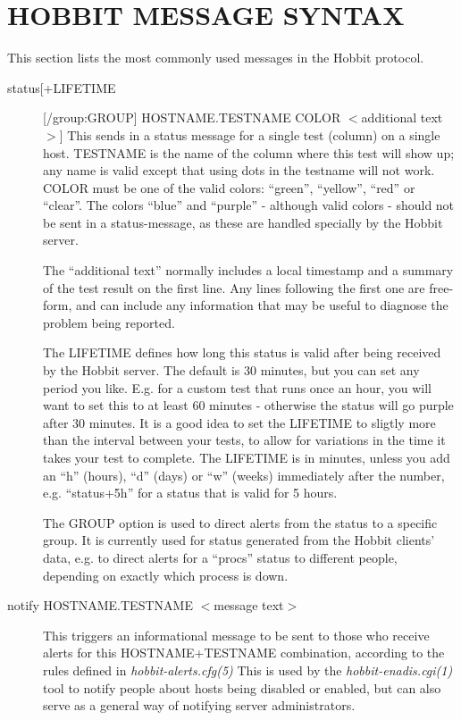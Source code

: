\section{HOBBIT MESSAGE SYNTAX}


This section lists the most commonly used messages in the Hobbit protocol. 


\begin{description}

\item[status[+LIFETIME][/group:GROUP] HOSTNAME.TESTNAME COLOR
  $<$additional text$>$] This sends in a status message for a single
  test (column) on a single host. TESTNAME is the name of the column
  where this test will show up; any name is valid except that using
  dots in the testname will not work. COLOR must be one of the valid
  colors: ``green'', ``yellow'', ``red'' or ``clear''. The colors
  ``blue'' and ``purple'' - although valid colors - should not be sent
  in a status-message, as these are handled specially by the Hobbit
  server.  

The ``additional text'' normally includes a local timestamp and a
summary of the test result on the first line. Any lines following the
first one are free-form, and can include any information that may be
useful to diagnose the problem being reported.  

The LIFETIME defines how long this status is valid after being
received by the Hobbit server. The default is 30 minutes, but you can
set any period you like. E.g. for a custom test that runs once an
hour, you will want to set this to at least 60 minutes - otherwise the
status will go purple after 30 minutes. It is a good idea to set the
LIFETIME to sligtly more than the interval between your tests, to
allow for variations in the time it takes your test to complete. The
LIFETIME is in minutes, unless you add an ``h'' (hours), ``d'' (days)
or ``w'' (weeks) immediately after the number, e.g. ``status+5h'' for
a status that is valid for 5 hours.  


The GROUP option is used to direct alerts from the status to a
specific group. It is currently used for status generated from the
Hobbit clients' data, e.g. to direct alerts for a ``procs'' status to
different people, depending on exactly which process is down. 


 

\item[notify HOSTNAME.TESTNAME $<$message text$>$] This triggers an
 informational message to be sent to those who receive alerts for this
 HOSTNAME+TESTNAME combination, according to the rules defined in
 \emph{hobbit-alerts.cfg(5)}  This is used by the
 \emph{hobbit-enadis.cgi(1)} tool to notify people about hosts being
 disabled or enabled, but can also serve as a general way of notifying
 server administrators. 



\end{description}
